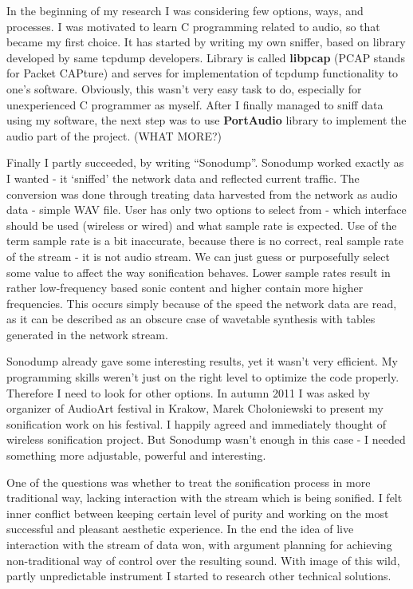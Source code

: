 \documentclass[11pt,a4paper,oneside]{report}
\begin{document}
In the beginning of my research I was considering few options, ways, and processes. I was motivated to learn C programming related to audio, so that became my first choice. It has started by writing my own sniffer, based on library developed by same tcpdump developers. Library is called \textbf{libpcap} (PCAP stands for Packet CAPture) and serves for implementation of tcpdump functionality to one's software. Obviously, this wasn't very easy task to do, especially for unexperienced C programmer as myself. After I finally managed to sniff data using my software, the next step was to use \textbf{PortAudio} library to implement the audio part of the project. (WHAT MORE?)

Finally I partly succeeded, by writing ``Sonodump''. Sonodump worked exactly as I wanted - it `sniffed' the network data and reflected current traffic. The conversion was done through treating data harvested from the network as audio data - simple WAV file. User has only two options to select from - which interface should be used (wireless or wired) and what sample rate is expected. Use of the term sample rate is a bit inaccurate, because there is no correct, real sample rate of the stream - it is not audio stream. We can just guess or purposefully select some value to affect the way sonification behaves. Lower sample rates result in rather low-frequency based sonic content and higher contain more higher frequencies. This occurs simply because of the speed the network data are read, as it can be described as an obscure case of wavetable synthesis with tables generated in the network stream.

Sonodump already gave some interesting results, yet it wasn't very efficient. My programming skills weren't just on the right level to optimize the code properly. Therefore I need to look for other options. In autumn 2011 I was asked by organizer of AudioArt festival in Krakow, Marek Chołoniewski to present my sonification work on his festival. I happily agreed and immediately thought of wireless sonification project. But Sonodump wasn't enough in this case - I needed something more adjustable, powerful and interesting.

One of the questions was whether to treat the sonification process in more traditional way, lacking interaction with the stream which is being sonified. I felt inner conflict between keeping certain level of purity and working on the most successful and pleasant aesthetic experience. In the end the idea of live interaction with the stream of data won, with argument planning for achieving non-traditional way of control over the resulting sound. With image of this wild, partly unpredictable instrument I started to research other technical solutions.
\end{document}
